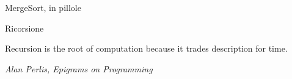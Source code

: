 \begin{OnlySlides}{MergeSort, in pillole}
\begin{center}
\end{center}
\end{OnlySlides}


\begin{OnlySlides}{Ricorsione}

\setlength{}
\epigraph{\alert{Recursion is the root of computation because it trades description for time.}
}{\textit{Alan Perlis, Epigrams on Programming}}


\begin{center}
\end{center}

\end{OnlySlides}




